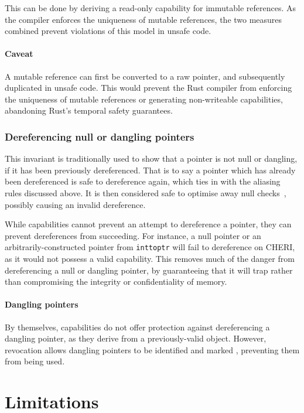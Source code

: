 \documentclass[dissertation.tex]{subfiles}
\begin{document}
This can be done by deriving a read-only capability for immutable
references.
As the compiler enforces the uniqueness of mutable references, the two
measures combined prevent violations of this model in unsafe code.

\paragraph{Caveat}
A mutable reference can first be converted to a raw pointer, and
subsequently duplicated in unsafe code.
This would prevent the Rust compiler from enforcing the uniqueness of
mutable references or generating non-writeable capabilities, abandoning
Rust's temporal safety guarantees.

\subsubsection{Dereferencing null or dangling pointers}
This invariant is traditionally used to show that a pointer is not
null or dangling, if it has been previously dereferenced.
That is to say a pointer which has already been dereferenced is safe to
dereference again, which ties in with the aliasing rules discussed
above.
It is then considered safe to optimise away null
checks~\cite{wang2013towards,llvm-undef-dce}, possibly causing an
invalid dereference.

While capabilities cannot prevent an attempt to dereference a pointer,
they can prevent dereferences from succeeding.
For instance, a null pointer or an arbitrarily-constructed pointer from
\texttt{inttoptr} will fail to dereference on CHERI, as it would not
possess a valid capability.
This removes much of the danger from dereferencing a null or dangling
pointer, by guaranteeing that it will trap rather than compromising the
integrity or confidentiality of memory.

\paragraph{Dangling pointers}
By themselves, capabilities do not offer protection against
dereferencing a dangling pointer, as they derive from a previously-valid
object.
However, revocation allows dangling pointers to be identified and marked
, preventing them from being used.


\section{Limitations}
\end{document}
